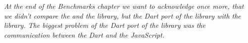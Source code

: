	\textit{At the end of the Benchmarks chapter we want to acknowledge once more, that we didn't compare the \react and the \tiles library, but the Dart port of the \react library with the \tiles library.
	The biggest problem of the Dart port of the \react library was the communication between the Dart and the JavaScript.}
